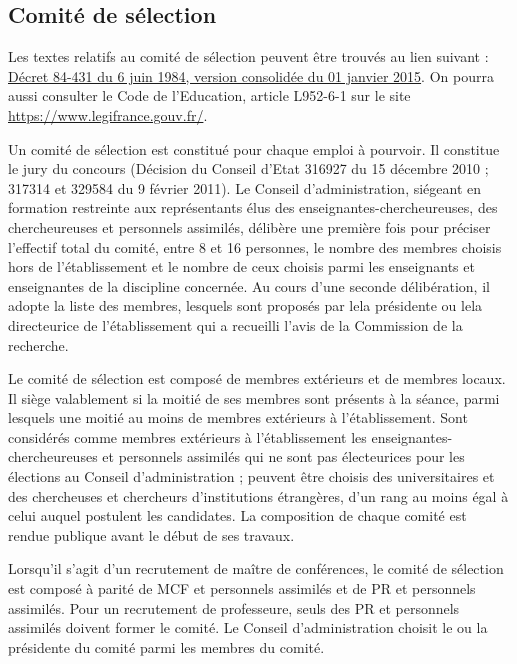 \subsection{Comit\'e de s\'election}\label{sec. comiteselection}

Les textes relatifs au comit\'e de s\'election peuvent \^etre trouv\'es au lien suivant :
\href{https://www.legifrance.gouv.fr/loda/id/JORFTEXT000000520453/2023-04-15/}{D\'ecret 84-431 du 6 juin 1984, version consolid\'ee du 01 janvier 2015}. 
On pourra aussi consulter le Code de l'Education, article L952-6-1 sur le
site \url{https://www.legifrance.gouv.fr/}.


Un comit\'e de s\'election est constitu\'e pour chaque emploi \`a pourvoir. Il constitue le jury du concours 
(D\'ecision du Conseil d'Etat 316927 du 15 d\'ecembre 2010 ; 317314 et 329584 du 9 f\'evrier 2011). 
Le Conseil d'administration, si\'egeant en formation
restreinte aux repr\'esentants \'elus des enseignant\mp e\mp s-chercheur\mp euse\mp s, des chercheur\mp euse\mp s et personnels assimil\'es, d\'elib\`ere
une premi\`ere fois pour pr\'eciser l'effectif total du comit\'e, entre 8 et 16 personnes, le nombre des membres choisis hors de
l'\'etablissement et le nombre de ceux choisis parmi les enseignants et enseignantes de la discipline concern\'ee. Au cours d'une
seconde d\'elib\'eration, il adopte la liste des membres, lesquels sont propos\'es par le\mp la pr\'esident\mp e ou le\mp la directeur\mp ice de
l'\'etablissement qui a recueilli l'avis de la Commission de la recherche.

Le comit\'e de s\'election est compos\'e de membres ext\'erieurs et de membres \og locaux\fg{}. Il si\`ege valablement si la moiti\'e de ses membres sont pr\'esents \`a la s\'eance, parmi lesquels une moiti\'e au moins de membres ext\'erieurs \`a l'\'etablissement. Sont consid\'er\'es comme membres ext\'erieurs \`a l'\'etablissement les enseignant\mp e\mp s-chercheur\mp euse\mp s et personnels assimil\'es qui ne sont pas \'electeur\mp ice\mp s pour les \'elections
au Conseil d'administration ; peuvent \^etre choisis des universitaires et des chercheuses et chercheurs d'institutions \'etrang\`eres,
d'un rang au moins \'egal \`a celui auquel postulent les candidat\mp e\mp s. La composition de chaque comit\'e est rendue
publique avant le d\'ebut de ses travaux.

Lorsqu'il s'agit d'un recrutement de ma\^itre de conf\'erences, le comit\'e de s\'election est compos\'e \`a parit\'e de MCF
et personnels assimil\'es et de PR et personnels assimil\'es. Pour un recrutement de professeur\mp e, seuls des PR et
personnels assimil\'es doivent former le comit\'e. Le Conseil d'administration choisit le ou la pr\'esident\mp e du comit\'e parmi les
membres du comit\'e.

